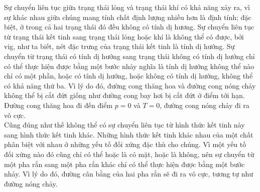 Sự chuyển liên tục giữa trạng thái lỏng và trạng thái khí có khả năng xảy ra, vì sự khác nhau giữa chúng mang tính chất định lượng nhiều hơn là định tính; đặc biệt, ở trong cả hai trạng thái đó đều không có tính dị hương. Sự chuyển liên tục từ trạng thái kết tinh sang trạng thái lỏng hoặc khí là không thể có được, bởi vig, như ta biết, nét đặc trưng của trạng thái kết tinh là tính dị hướng. Sự chuyển từ trạng thái có tính dị hướng sang trạng thái không có tính dị hướng chỉ có thể thực hiện được bằng một bước nhảy nghĩa là tính dị hướng không thể nào chỉ có một phần, hoặc có tính dị hướng, hoặc không có tính dị hướng, không thể có khả năng thứ ba. Vì lý do đó, đường cong thăng hoa và đường cong nóng chảy không thể bị cắt đứt giống như đường cong bay hơi bị cắt đứt ở điểm tới hạn. Đường cong thăng hoa đi đến điểm $p=0$ và $T=0$, đường cong nóng chảy đi ra vô cực.\\

Cũng đúng như thế không thể có sự chuyển liên tục từ hình thức kết tinh này sang hình thức kết tinh khác. Những hình thức kết tinh khác nhau của một chất phân biệt với nhau ở những yếu tố đối xứng đặc thù cho chúng. Vì một yếu tố đối xứng nào đó cũng chỉ có thể hoặc là có mặt, hoặc là không, nên sự chuyển từ một pha rắn sang một pha rắn khác chỉ có thể thực hiện được bằng một bước nhảy. Vì lý do đó, đường cân bằng của hai pha rắn sẽ đi ra vô cực, tương tự như đường nóng chảy.
